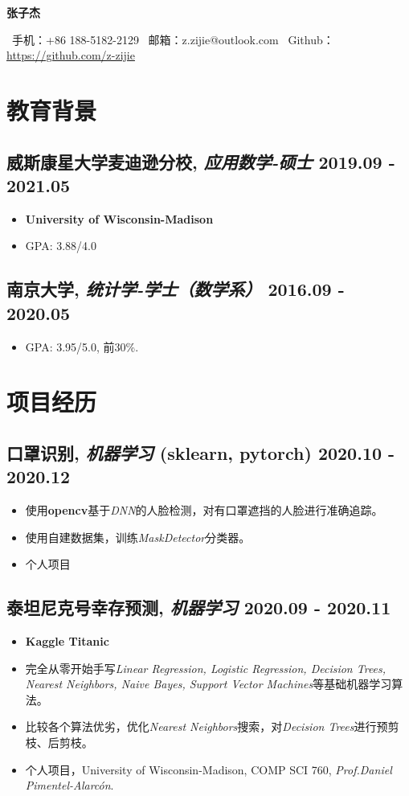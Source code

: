 \documentclass[11pt]{article}
\newcommand{\datedsubsection}[2]{%
    \subsection[#1]{#1 \hfill #2}%
}
\newcommand{\name}[1]{
    \centerline{\Huge\scshape\textbf{#1}}
    \vspace{1.2ex}
}
\newcommand{\contactInfo}[3]{
    \centerline{
        \sffamily\large{
            \ 手机：{#1} \textperiodcentered
            \ 邮箱：{#2} \textperiodcentered
            \ {Github}：\normalsize\url{#3}
            }
        } 
    \vspace{1.2ex}
}
\begin{document}
\name{张子杰}
\contactInfo{+86 188-5182-2129}{z.zijie@outlook.com}{https://github.com/z-zijie}

\section{\textbf{教育背景}}
\datedsubsection{
    \textbf{威斯康星大学麦迪逊分校},
    \textit{应用数学-硕士}}
    {2019.09 - 2021.05}
    \begin{itemize} [parsep=1ex]
        \item \textbf{University of Wisconsin-Madison}
        \item GPA: 3.88/4.0
    \end{itemize}

\datedsubsection{
    \textbf{南京大学},
    \textit{统计学-学士（数学系）}}
    {2016.09 - 2020.05}
    \begin{itemize} [parsep=1ex]
        \item GPA: 3.95/5.0, 前30\%.
    \end{itemize}

\hspace*{\fill}
\section{\textbf{项目经历}}
\datedsubsection{
    \textbf{口罩识别},
    \textit{机器学习}
    (sklearn, pytorch)}
    {2020.10 - 2020.12}
    \begin{itemize} [parsep=1ex]
        \item 使用\textbf{opencv}基于\textit{DNN}的人脸检测，对有口罩遮挡的人脸进行准确追踪。
        \item 使用自建数据集，训练\textit{MaskDetector}分类器。
        \item 个人项目
    \end{itemize}

\datedsubsection{
    \textbf{泰坦尼克号幸存预测},
    \textit{机器学习}}
    {2020.09 - 2020.11}
    \begin{itemize} [parsep=1ex]
        \item \textbf{Kaggle Titanic}
        \item 完全从零开始手写\textit{Linear Regression, Logistic Regression, Decision Trees, Nearest Neighbors, Naive Bayes, Support Vector Machines}等基础机器学习算法。
        \item 比较各个算法优劣，优化\textit{Nearest Neighbors}搜索，对\textit{Decision Trees}进行预剪枝、后剪枝。
        \item 个人项目，University of Wisconsin-Madison, COMP SCI 760, \textit{Prof.Daniel Pimentel-Alarcón}.
    \end{itemize}
\end{document}
